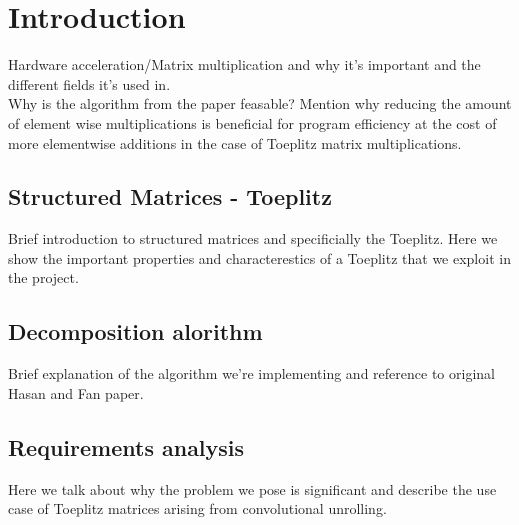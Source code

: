 \chapter{Introduction}
Hardware acceleration/Matrix multiplication and why it's important and the different fields it's used in. \\

Why is the algorithm from the paper feasable? 
Mention why reducing the amount of element wise multiplications is 
beneficial for program efficiency at the cost of more 
elementwise additions in the case of Toeplitz matrix multiplications.
\section{Structured Matrices - Toeplitz} 
Brief introduction to structured matrices and specificially 
the Toeplitz. Here we show the important properties and characterestics 
of a Toeplitz that we exploit in the project. 
\section{Decomposition alorithm}
Brief explanation of the algorithm we're implementing and reference 
to original Hasan and Fan paper. 
\section{Requirements analysis}
Here we talk about why the problem we pose is significant and describe the use case of 
Toeplitz matrices arising from convolutional unrolling. 





